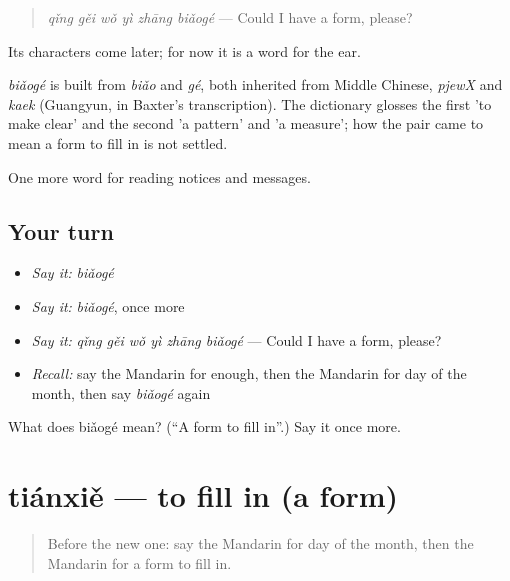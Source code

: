 \begin{quote}
\emph{qǐng gěi wǒ yì zhāng biǎogé} — Could I have a form, please?
\end{quote}

Its characters come later; for now it is a word for the ear.

\begin{cousinweb}
\emph{biǎogé} is built from \emph{biǎo} and \emph{gé}, both inherited from Middle Chinese, \emph{pjewX} and \emph{kaek} (Guangyun, in Baxter's transcription). The dictionary glosses the first 'to make clear' and the second 'a pattern' and 'a measure'; how the pair came to mean a form to fill in is not settled.
\end{cousinweb}

\begin{grammarlens}[title={What you've built}]
One more word for reading notices and messages.
\end{grammarlens}

\subsection*{Your turn}
\begin{itemize}
\raggedright
  \item \emph{Say it:} \emph{biǎogé}
  \item \emph{Say it:} \emph{biǎogé}, once more
  \item \emph{Say it:} \emph{qǐng gěi wǒ yì zhāng biǎogé} — Could I have a form, please?
  \item \emph{Recall:} say the Mandarin for enough, then the Mandarin for day of the month, then say \emph{biǎogé} again
\end{itemize}

\begin{tcolorbox}[breakable,colback=teal!4,colframe=teal!35!black,title={Before you move on}]
What does biǎogé mean? (\textquotedblleft{}A form to fill in\textquotedblright{}.) Say it once more.
\end{tcolorbox}
\section[tiánxiě]{tiánxiě — to fill in (a form)}

\label{lesson:ZH-C189-tianxie}



\begin{quote}
Before the new one: say the Mandarin for day of the month, then the Mandarin for a form to fill in.
\end{quote}

